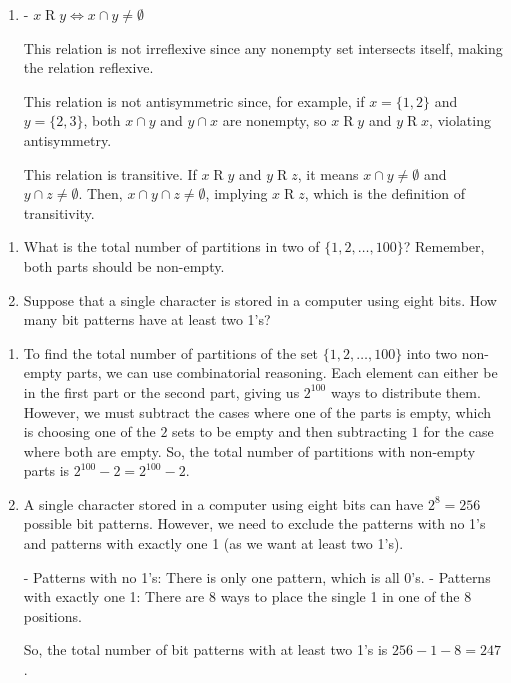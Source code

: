\documentclass{article}
\theoremstyle{definition}
\begin{document}
\begin{solution}
\begin{enumerate}
    \item 
    - \(x \mathrel{R} y \iff x \cap y \neq \emptyset\)
    
    This relation is not irreflexive since any nonempty set intersects itself, making the relation reflexive.
    
    This relation is not antisymmetric since, for example, if \(x = \{1, 2\}\) and \(y = \{2, 3\}\), both \(x \cap y\) and \(y \cap x\) are nonempty, so \(x \mathrel{R} y\) and \(y \mathrel{R} x\), violating antisymmetry.
    
    This relation is transitive. If \(x \mathrel{R} y\) and \(y \mathrel{R} z\), it means \(x \cap y \neq \emptyset\) and \(y \cap z \neq \emptyset\). Then, \(x \cap y \cap z \neq \emptyset\), implying \(x \mathrel{R} z\), which is the definition of transitivity.
\end{enumerate}
\end{solution}


\begin{question}
    \begin{enumerate}
   	\item What is the total number of partitions in two of $\{1, 2, \dots, 100 \}$? 
	Remember, both parts should be non-empty.
        \item Suppose that a single character is stored in a computer using eight bits. 
        How many bit patterns have at least two 1's?
   	\end{enumerate}
\end{question}
\begin{solution}
\begin{enumerate}
    \item To find the total number of partitions of the set $\{1, 2, \dots, 100\}$ into two non-empty parts, we can use combinatorial reasoning. Each element can either be in the first part or the second part, giving us $2^{100}$ ways to distribute them. However, we must subtract the cases where one of the parts is empty, which is choosing one of the $2$ sets to be empty and then subtracting $1$ for the case where both are empty. So, the total number of partitions with non-empty parts is $2^{100} - 2 = 2^{100} - 2$.
    
    \item A single character stored in a computer using eight bits can have $2^8 = 256$ possible bit patterns. However, we need to exclude the patterns with no 1's and patterns with exactly one 1 (as we want at least two 1's). 
    
    - Patterns with no 1's: There is only one pattern, which is all $0$'s.
    - Patterns with exactly one 1: There are $8$ ways to place the single 1 in one of the $8$ positions.
    
    So, the total number of bit patterns with at least two 1's is $256 - 1 - 8 = 247$.
\end{enumerate}
\end{solution}
\end{document}
